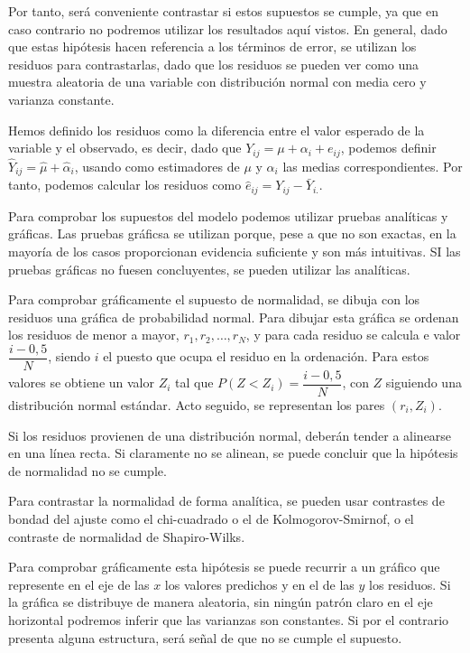 Por tanto, ser\'a conveniente contrastar si estos supuestos se cumple, ya que en caso contrario no podremos utilizar los resultados aqu\'i vistos. En general, dado que estas hip\'otesis hacen referencia a los t\'erminos de error, se utilizan los residuos para contrastarlas, dado que los residuos se pueden ver como una muestra aleatoria de una variable con distribuci\'on normal con media cero y varianza constante.

Hemos definido los residuos como la diferencia entre el valor esperado de la variable y el observado, es decir, dado que $Y_{ij}=\mu+\alpha_i+e_{ij}$, podemos definir $\hat{Y}_{ij}=\hat{\mu}+\hat{\alpha}_i$, usando como estimadores de $\mu$ y $\alpha_i$ las medias correspondientes. Por tanto, podemos calcular los residuos como $\hat{e}_{ij}=Y_{ij}-\bar{Y}_{i.}$.

Para comprobar los supuestos del modelo podemos utilizar pruebas anal\'iticas y gr\'aficas. Las pruebas gr\'aficsa se utilizan porque, pese a que no son exactas, en la mayor\'ia de los casos proporcionan evidencia suficiente y son m\'as intuitivas. SI las pruebas gr\'aficas no fuesen concluyentes, se pueden utilizar las anal\'iticas.


Para comprobar gr\'aficamente el supuesto de normalidad, se dibuja con los residuos una gr\'afica de probabilidad normal. Para dibujar esta gr\'afica se ordenan los residuos de menor a mayor, $r_1,r_2,\ldots,r_N$, y para cada residuo se calcula e valor $\dfrac{i-0,5}{N}$, siendo $i$ el puesto que ocupa el residuo en la ordenaci\'on. Para estos valores se obtiene un valor $Z_i$ tal que $P(Z<Z_i)=\dfrac{i-0,5}{N}$, con $Z$ siguiendo una distribuci\'on normal est\'andar. Acto seguido, se representan los pares $(r_i, Z_i)$.

Si los residuos provienen de una distribuci\'on normal, deber\'an tender a alinearse en una l\'inea recta. Si claramente no se alinean, se puede concluir que la hip\'otesis de normalidad no se cumple.

Para contrastar la normalidad de forma anal\'itica, se pueden usar contrastes de bondad del ajuste como el chi-cuadrado o el de Kolmogorov-Smirnof, o el contraste de normalidad de Shapiro-Wilks.


Para comprobar gr\'aficamente esta hip\'otesis se puede recurrir a un gr\'afico que represente en el eje de las $x$ los valores predichos y en el de las $y$ los residuos. Si la gr\'afica se distribuye de manera aleatoria, sin ning\'un patr\'on claro en el eje horizontal podremos inferir que las varianzas son constantes. Si por el contrario presenta alguna estructura, ser\'a se\~nal de que no se cumple el supuesto.

